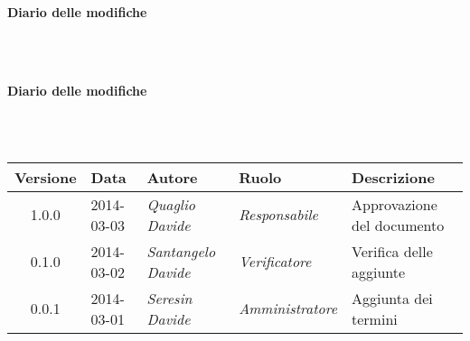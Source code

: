 \noindent\begin{Large}\textbf{Diario delle modifiche}\end{Large}\\
\\
\noindent\begin{Large}\textbf{Diario delle modifiche}\end{Large}\\
\\
\begin{small}
\begin{tabular}{|c|p{1.8cm}|p{2.8cm}|p{2.8cm}|p{3.5cm}|}
\hline
Versione & Data & Autore & Ruolo & Descrizione \\
\hline
\hline
1.0.0 & 2014-03-03 & 
\textit{Quaglio Davide} &
\textit{Responsabile} &  Approvazione del documento\\
\hline
0.1.0 & 2014-03-02 & 
\textit{Santangelo Davide} &
\textit{Verificatore} &  Verifica delle aggiunte\\
\hline
0.0.1 & 2014-03-01 & 
\textit{Seresin Davide} &
\textit{Amministratore} &  Aggiunta dei termini\\
\hline
\end{tabular}\\
\end{small}